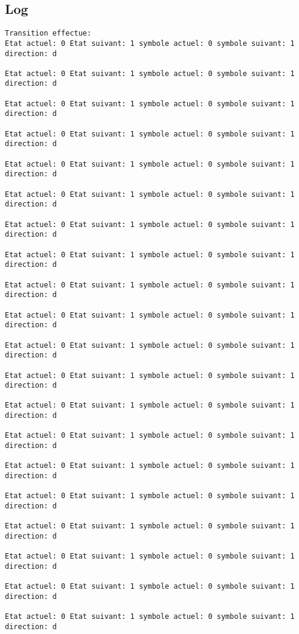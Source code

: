 \documentclass{article}
\begin{document}
\subsection{Log}
\begin{verbatim}
Transition effectue:
Etat actuel: 0 Etat suivant: 1 symbole actuel: 0 symbole suivant: 1 direction: d

Etat actuel: 0 Etat suivant: 1 symbole actuel: 0 symbole suivant: 1 direction: d

Etat actuel: 0 Etat suivant: 1 symbole actuel: 0 symbole suivant: 1 direction: d

Etat actuel: 0 Etat suivant: 1 symbole actuel: 0 symbole suivant: 1 direction: d

Etat actuel: 0 Etat suivant: 1 symbole actuel: 0 symbole suivant: 1 direction: d

Etat actuel: 0 Etat suivant: 1 symbole actuel: 0 symbole suivant: 1 direction: d

Etat actuel: 0 Etat suivant: 1 symbole actuel: 0 symbole suivant: 1 direction: d

Etat actuel: 0 Etat suivant: 1 symbole actuel: 0 symbole suivant: 1 direction: d

Etat actuel: 0 Etat suivant: 1 symbole actuel: 0 symbole suivant: 1 direction: d

Etat actuel: 0 Etat suivant: 1 symbole actuel: 0 symbole suivant: 1 direction: d

Etat actuel: 0 Etat suivant: 1 symbole actuel: 0 symbole suivant: 1 direction: d

Etat actuel: 0 Etat suivant: 1 symbole actuel: 0 symbole suivant: 1 direction: d

Etat actuel: 0 Etat suivant: 1 symbole actuel: 0 symbole suivant: 1 direction: d

Etat actuel: 0 Etat suivant: 1 symbole actuel: 0 symbole suivant: 1 direction: d

Etat actuel: 0 Etat suivant: 1 symbole actuel: 0 symbole suivant: 1 direction: d

Etat actuel: 0 Etat suivant: 1 symbole actuel: 0 symbole suivant: 1 direction: d

Etat actuel: 0 Etat suivant: 1 symbole actuel: 0 symbole suivant: 1 direction: d

Etat actuel: 0 Etat suivant: 1 symbole actuel: 0 symbole suivant: 1 direction: d

Etat actuel: 0 Etat suivant: 1 symbole actuel: 0 symbole suivant: 1 direction: d

Etat actuel: 0 Etat suivant: 1 symbole actuel: 0 symbole suivant: 1 direction: d


\end{verbatim}
\end{document}
